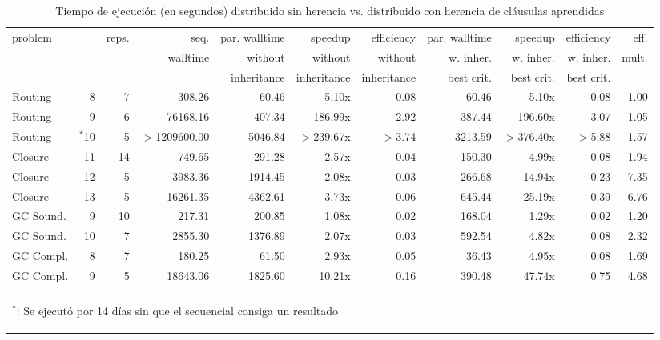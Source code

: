 \begin{table}
	\small
	\begin{tabular}{lrrrrrrrrrr}
		\toprule
		problem	&			&	reps.	& 	seq.		&  par. walltime	&	speedup				&	efficiency			& par.	walltime				& speedup 							& efficiency			& eff. \\
				&			&	 		& walltime		&  without 			&	without				&	without				& w. inher.	& w. inher. 	& w. inher.	& mult. \\
				&			&	 		& 				& inheritance 		&	 inheritance		&	 inheritance	 	& best crit.	& best crit. 	& best crit.	&  \\
		\cmidrule(r){1-11}
		Routing	&	8		&		7 	& 308.26		&  60.46		& 5.10x		&	0.08 		& 60.46			&	5.10x	& 0.08		& 1.00 \\
		Routing	&	9		&	6 		& 76168.16		&  407.34		& 	186.99x	&	2.92 		& 387.44		& 196.60x	& 3.07		& 1.05 \\
		Routing	&	$^*$10	&	5 		& $>$1209600.00	&  5046.84		&$>$239.67x	&	$>$3.74 	& 3213.59		&$>$376.40x	& $>$5.88	& 1.57 \\
		\cmidrule(r){1-11}
		Closure	&	11		&	14 		& 749.65		&  291.28		&	2.57x	&	0.04 		& 150.30		&  4.99x	& 0.08		& 1.94 \\
		Closure	&	12		&	5 		& 3983.36		&  1914.45		&	2.08x	&	0.03 		& 266.68		& 14.94x	& 0.23		& 7.35 \\
		Closure	&	13		&  5 		& 16261.35		& 	4362.61		&	3.73x	&	0.06 		& 645.44		& 25.19x	& 0.39		& 6.76 \\
		\cmidrule(r){1-11}
		GC Sound.&	9		&	10 		& 217.31		&  200.85		&	1.08x	&	0.02 		& 168.04		& 1.29x		& 0.02		& 1.20 \\
		GC Sound.&	10		&	7 		&  2855.30		&  1376.89		&	2.07x	&	0.03 		& 592.54		& 4.82x		& 0.08		& 2.32 \\
		\cmidrule(r){1-11}
		GC Compl.	& 8		&	7 		& 180.25		&  61.50		&	2.93x	&	0.05 		& 36.43			& 4.95x		& 0.08		& 1.69 \\
		GC Compl.	& 9	&	5 		& 18643.06		&  1825.60		&	10.21x	&	0.16 		& 390.48		& 47.74x	& 0.75		& 4.68 \\
		\bottomrule
		\\
		\multicolumn{10}{l}{\begin{tiny}$^*$: Se ejecutó por 14 días sin que el \ssolver secuencial consiga un resultado\end{tiny}}
	\end{tabular}
	\caption{Tiempo de ejecución (en segundos) distribuido sin herencia vs. distribuido con herencia de cláusulas aprendidas}
	\label{tab:mejorlearning}
\end{table}

